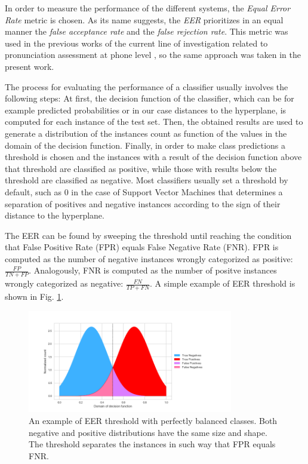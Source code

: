 In order to measure the performance of the different systems, the \textit{Equal Error Rate} metric
is chosen. As its name suggests, the \textit{EER} prioritizes in an equal manner the
\textit{false acceptance rate} and the \textit{false rejection rate}. This metric was used
in the previous works of the current line of investigation related to pronunciation assessment
at phone level \cite{detection_phone_level_mispronunciation_learning, main}, so the same approach
was taken in the present work.

The process for evaluating the performance of a classifier usually involves the following steps:
At first, the decision function of the classifier, which can be for example predicted probabilities
or in our case distances to the hyperplane, is computed for each instance of the test set.
Then, the obtained results are used to generate
a distribution of the instances count as function of the values
in the domain of the decision function. Finally,
in order to make class predictions a threshold is chosen and the instances with a result of the
decision function above that threshold are classified as positive, while
those with results below the threshold are classified as negative. Most classifiers
usually set a threshold by default, such as 0 in the case of Support Vector Machines that
determines a separation of
positives and negative instances according to the sign of their distance to the hyperplane.

The EER can be found by sweeping the threshold until reaching the condition that
False Positive Rate (FPR) equals False Negative Rate (FNR). FPR is computed as
the number of negative instances wrongly categorized as positive: $\frac{FP}{TN+FP}$.
Analogously, FNR is computed as the number of positve instances wrongly categorized as negative:
$\frac{FN}{TP+FN}$. A simple example of EER threshold is
shown in Fig. \ref{fig:eer}.

\begin{figure}[H]
  \centering
  \includegraphics[width=0.8\textwidth]{files/figures/method/eer}
  \caption{An example of EER threshold with perfectly balanced classes. Both negative and positive distributions have the same size and shape.
  The threshold separates the instances in such way that FPR equals FNR.}
  \label{fig:eer}
\end{figure}

